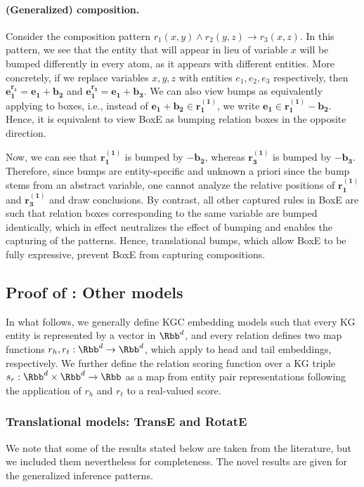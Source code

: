 \documentclass{article}
\begin{document}
\paragraph{(Generalized) composition.} Consider the composition pattern $r_1(x,y) \land r_2(y,z) \rightarrow r_3(x,z)$. In this pattern, we see that the entity that will appear in lieu of variable $x$ will be bumped differently in every atom, as it appears with different entities. More concretely, if we replace variables $x,y,z$ with entities $e_1, e_2, e_3$ respectively, then $\bm{e_1^{r_1}} = \bm{e_1} + \bm{b_2}$ and $\bm{e_1^{r_3}} = \bm{e_1} + \bm{b_3}$. We can also view bumps as equivalently applying to boxes, i.e., instead of $\bm{e_1} + \bm{b_2} \in \bm{r_1^{(1)}}$, we write $\bm{e_1} \in \bm{r_1^{(1)}} - \bm{b_2}$. Hence, it is equivalent to view BoxE as bumping relation boxes in the opposite direction. 

Now, we can see that  $\bm{r_1^{(1)}}$ is bumped by $-\bm{b_2}$, whereas $\bm{r_3^{(1)}}$ is bumped by $-\bm{b_3}$. Therefore, since bumps are entity-specific and unknown a priori since the bump stems from an abstract variable, one cannot analyze the relative positions of $\bm{r_1^{(1)}}$ and $\bm{r_3^{(1)}}$ and draw conclusions. By contrast, all other captured rules in BoxE are such that relation boxes corresponding to the same variable are bumped identically, which in effect neutralizes the effect of bumping and enables the capturing of the patterns. Hence, translational bumps, which allow BoxE to be fully expressive, prevent BoxE from capturing compositions.

\subsection{Proof of : Other models}

In what follows, we generally define KGC embedding models such that every KG entity is represented by a vector in $\Rbb^d$, and every relation defines two map functions $r_{h},r_{t}: \Rbb^d \rightarrow \Rbb^d$, which apply to head and tail embeddings, respectively. We further define the relation scoring function over a KG triple $s_r: \Rbb^d \times \Rbb^d \rightarrow \Rbb$ as a map from entity pair representations following the application of $r_h$ and $r_t$ to a real-valued score. 

\subsubsection{Translational models: TransE and RotatE}
We note that some of the results stated below are taken from the literature, but we included them nevertheless for completeness. The novel results are given for the generalized inference patterns.
\end{document}
